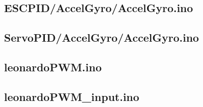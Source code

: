 \documentclass[a4paper,11pt]{article}
\begin{document}
\subsection{ESCPID/AccelGyro/AccelGyro.ino}

\subsection{ServoPID/AccelGyro/AccelGyro.ino}

\subsection{leonardoPWM.ino}

\subsection{leonardoPWM\_input.ino}

\end{document}
